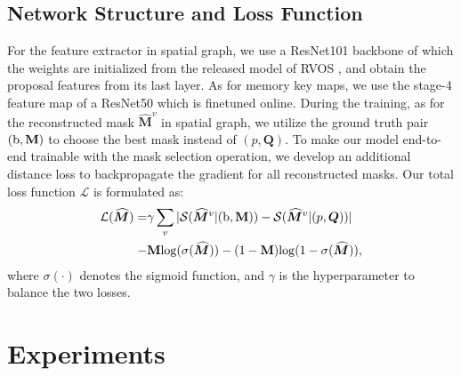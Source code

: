 \documentclass[letterpaper]{article} %
\begin{document}
\subsection{Network Structure and Loss Function}
For the feature extractor in spatial graph, we use a ResNet101 backbone of which the weights are initialized from the released model of RVOS \cite{ventura2019rvos}, and obtain the proposal features from its last layer. As for memory key maps, we use the stage-4 feature map of a ResNet50 which is finetuned online. During the training, as for the reconstructed mask $\widehat{\bm{M}}^{v}$ in spatial graph, we utilize the ground truth pair $(\rm{b}, \textbf{M})$ to choose the best mask instead of $(p,\bm{Q})$. To make our model end-to-end trainable with the mask selection operation, we develop an additional distance loss to backpropagate the gradient for all reconstructed masks. Our total loss function $\mathcal{L}$ is formulated as:
\begin{align}
    \mathcal{L}(\widehat{\bm{M}}) = & \gamma\sum_{v} |{\mathcal{S}}(\widehat{\bm{M}}^{v}|({\rm{b}, \textbf{M}}))-{\mathcal{S}}(\widehat{\bm{M}}^{v}|({p, \bm{Q}}))| \nonumber\\
    - & {\rm \textbf{M}}{\rm log}(\sigma(\widehat{\bm{M}})) - (1-{\rm \textbf{M}}){\rm log}(1-\sigma(\widehat{\bm{M}})),
\label{eq:loss}
\end{align}
where $\sigma(\cdot)$ denotes the sigmoid function, and $\gamma$ is the hyperparameter to balance the two losses. 

\section{Experiments}
\end{document}
